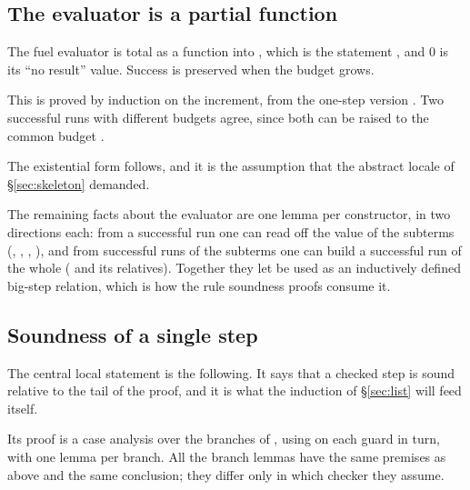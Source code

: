 \subsection{The evaluator is a partial function}

The fuel evaluator is total as a function into , which is the
statement , and $0$ is
its ``no result'' value.  Success is preserved when the budget grows.


\noindent
This is proved by induction on the increment, from the one-step version
.  Two successful runs with different budgets
agree, since both can be raised to the common budget .


\noindent
The existential form follows, and it is the assumption  that
the abstract locale of \S\ref{sec:skeleton} demanded.


\noindent
The remaining facts about the evaluator are one lemma per constructor, in two
directions each: from a successful run one can read off the value of the
subterms (, ,
, ), and from
successful runs of the subterms one can build a successful run of the whole
( and its relatives).  Together they let  be
used as an inductively defined big-step relation, which is how the rule
soundness proofs consume it.

\subsection{Soundness of a single step}

The central local statement is the following.  It says that a checked step is
sound relative to the tail of the proof, and it is what the induction of
\S\ref{sec:list} will feed itself.


\noindent
Its proof is a case analysis over the branches of , using
 on each guard in turn, with one lemma per branch.  All the
branch lemmas have the same premises as above and the same conclusion; they
differ only in which checker they assume.

